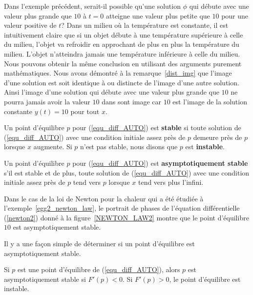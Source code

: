 {\begin{rmk}[\theory]
Dans l'exemple précédent, serait-il possible qu'une solution $\phi$
qui débute avec une valeur plus grande que $10$ à $t=0$ atteigne une
valeur plus petite que $10$ pour une valeur positive de $t$?  Dans un
milieu où la température est constante, il est intuitivement claire
que si un objet débute à une température supérieure à celle du milieu,
l'objet va refroidir en approchant de plus en plus la température du
milieu.  L'objet n'atteindra jamais une température inférieure à celle
du milieu.  Nous pouvons obtenir la même conclusion en utilisant des
arguments purement mathématiques.  Nous avons démontré à la
remarque~\ref{dist_img} que l'image d'une solution est soit identique
à ou distincte de l'image d'une autre solution.  Ainsi l'image d'une
solution qui débute avec une valeur plus grande que $10$ ne pourra
jamais avoir la valeur $10$ dans sont image car $10$ est l'image de la
solution constante $y(t) = 10$ pour tout $x$.
\end{rmk}

\begin{focus}{\dfn}
Un point d'équilibre $p$ pour (\ref{equ_diff_AUTO}) est
{\bfseries stable} si toute solution de (\ref{equ_diff_AUTO}) avec
une condition initiale assez près de $p$ demeure près de $p$ lorsque $x$
augmente.  Si $p$ n'est pas stable, nous disons que $p$ est
{\bfseries instable}.

Un point d'équilibre $p$ pour (\ref{equ_diff_AUTO}) est
{\bfseries asymptotiquement stable} s'il est
stable et de plus, toute solution de (\ref{equ_diff_AUTO}) avec une
condition initiale assez près de $p$ tend vers $p$ lorsque $x$ tend
vers plus l'infini.
\end{focus}

\begin{egg}
Dans le cas de la loi de Newton pour la chaleur qui a été étudiée à
l'exemple~\ref{egg2_newton_law}, le portrait de phases de l'équation
différentielle (\ref{newton2}) donné à la figure~\ref{NEWTON_LAW2}
montre que le point d'équilibre $10$ est asymptotiquement stable.
\end{egg}

Il y a une façon simple de déterminer si un point d'équilibre est
asymptotiquement stable.

\begin{focus}{\thm} \label{oneDstabth}
Si $p$ est une point d'équilibre de (\ref{equ_diff_AUTO}), alors $p$
est asymptotiquement stable si $F'(p)<0$.  Si $F'(p)>0$, le point
d'équilibre est instable.
\end{focus}

}
